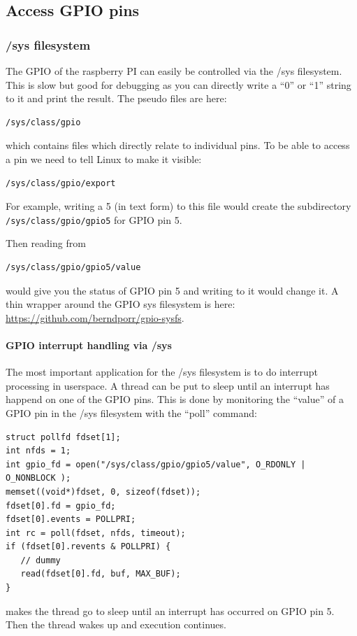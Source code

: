 \documentclass[12pt]{report}
\begin{document}
\subsection{Access GPIO pins}
\subsubsection{/sys filesystem}
The GPIO of the raspberry PI can easily be controlled via
the /sys filesystem. This is slow but good for
debugging as you can directly write a
``0'' or ``1'' string to it and print the result. The
pseudo files are here:
\begin{verbatim}
/sys/class/gpio
\end{verbatim}
which contains files which directly relate to individual pins.
To be able to access a pin we need to tell Linux to make
it visible:
\begin{verbatim}
/sys/class/gpio/export
\end{verbatim}
For example, writing a 5 (in text form) to this file would
create the subdirectory \texttt{/sys/class/gpio/gpio5} for GPIO pin 5.

Then reading from
\begin{verbatim}
/sys/class/gpio/gpio5/value
\end{verbatim}
would give you the status of GPIO pin 5 and writing
to it would change it.
A thin wrapper around the GPIO sys filesystem is here: \url{https://github.com/berndporr/gpio-sysfs}.

\paragraph{GPIO interrupt handling via /sys}
The most important application for the /sys filesystem is to
do interrupt processing in userspace.
A thread can be put to sleep until an interrupt has happend on one of
the GPIO pins. This is done by monitoring the ``value''
of a GPIO pin in the /sys filesystem with the ``poll'' command:
\begin{verbatim}
struct pollfd fdset[1];
int nfds = 1;
int gpio_fd = open("/sys/class/gpio/gpio5/value", O_RDONLY | O_NONBLOCK );
memset((void*)fdset, 0, sizeof(fdset));
fdset[0].fd = gpio_fd;
fdset[0].events = POLLPRI;
int rc = poll(fdset, nfds, timeout);
if (fdset[0].revents & POLLPRI) {
   // dummy
   read(fdset[0].fd, buf, MAX_BUF);
}
\end{verbatim}
makes the thread go to sleep until an interrupt has occurred on
GPIO pin 5. Then the thread wakes up and execution continues.
\end{document}
